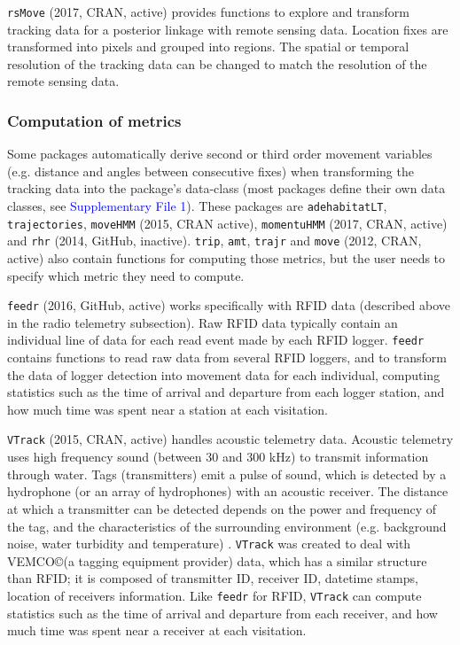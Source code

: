 \documentclass[a4paper,12pt]{article}
\newcommand{\Rpkg}[1]{\texttt{#1}}
\begin{document}
\Rpkg{rsMove} (2017, CRAN, active) provides functions to explore and transform tracking data for a posterior linkage with remote sensing data. Location fixes are transformed into pixels and grouped into regions. The spatial or temporal resolution of the tracking data can be changed to match the resolution of the remote sensing data. 

\subsubsection*{Computation of metrics}

Some packages automatically derive second or third order movement variables (e.g. distance and angles between consecutive fixes) when transforming the tracking data into the package's data-class (most packages define their own data classes, see \textcolor{blue}{Supplementary File 1}). These packages are \Rpkg{adehabitatLT}, \Rpkg{trajectories}, \Rpkg{moveHMM} (2015, CRAN active), \Rpkg{momentuHMM} (2017, CRAN, active) and \Rpkg{rhr} (2014, GitHub, inactive). \Rpkg{trip}, \Rpkg{amt}, \Rpkg{trajr} and \Rpkg{move} (2012, CRAN, active) also contain functions for computing those metrics, but the user needs to specify which metric they need to compute. 

\Rpkg{feedr} (2016, GitHub, active) works specifically with RFID data (described above in the radio telemetry subsection). Raw RFID data typically contain an individual line of data for each read event made by each RFID logger. \Rpkg{feedr} contains functions to read raw data from several RFID loggers, and to transform the data of logger detection into movement data for each individual, %
computing statistics such as the time of arrival and departure from each logger station, and how much time was spent near a station at each visitation. 

\Rpkg{VTrack} (2015, CRAN, active) handles acoustic telemetry data. Acoustic telemetry uses high frequency sound (between 30 and 300 kHz) to transmit information through water. Tags (transmitters) emit a pulse of sound, which is detected by a hydrophone (or an array of hydrophones) with an acoustic receiver. The distance at which a transmitter can be detected depends on the power and frequency of the tag, and the characteristics of the surrounding environment (e.g. background noise, water turbidity and temperature) \citep{Decelles2014}. \Rpkg{VTrack} was created to deal with VEMCO\copyright  (a tagging equipment provider) data, which has a similar structure than RFID; it is composed of transmitter ID, receiver ID, datetime stamps, location of receivers information. Like \Rpkg{feedr} for RFID, \Rpkg{VTrack} can compute statistics such as the time of arrival and departure from each receiver, and how much time was spent near a receiver at each visitation.
\end{document}
